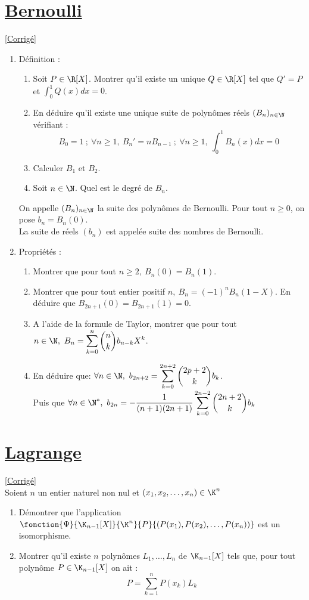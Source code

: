 \documentclass{book}
\begin{document}
	\section{\underline{Bernoulli} }
	\textcolor{blue}{\hyperref[sec:Bernoulli]{[Corrigé]}}\\
	\label{Bernoulli}
	\begin{enumerate}[leftmargin=*]
		\item Définition :
		\begin{enumerate}[label=\alph*.]
			\item Soit $P\in\R[X]$. Montrer qu'il existe un unique $Q\in\R[X]$ tel que $Q'=P$ et $\displaystyle\int_0^1 Q(x)dx=0$.
			\item En déduire qu'il existe une unique suite de polynômes réels $(B_n)_{n\in \N}$ vérifiant :
			$$B_0=1\ ; \ \forall n \geq 1, \ B_n'=nB_{n-1} \ ; \ \forall n \geq 1, \ \int_0^1 B_n(x)dx=0$$
			\item Calculer $B_1$ et $B_2$.
			\item Soit $n\in \N$. Quel est le degré de $B_n$.
		\end{enumerate}
		On appelle $(B_n)_{n\in \N}$ la suite des polynômes de Bernoulli. Pour tout $n\geq 0$, on pose $b_n=B_n(0)$. \\La suite de réels $(b_n)$ est appelée suite des nombres de Bernoulli.
		\item Propriétés :
		\begin{enumerate}[label=\alph*.]
			\item Montrer que pour tout $n\geq 2,\ B_n(0)=B_n(1)$.
			\item Montrer que pour tout entier positif $n,\ B_n=(-1)^nB_n(1-X)$. En déduire que $B_{2n+1}(0)=B_{2n+1}(1)=0$.
			\item A l'aide de la formule de Taylor, montrer que pour tout $n\in\N,\ B_n=\displaystyle\sum\limits_{k=0}^n \binom{n}{k}b_{n-k}X^k$.
			\item En déduire que: $\forall n\in\N,\ b_{2n+2}=\displaystyle\sum\limits_{k=0}^{2n+2}\binom{2p+2}{k}b_k$. \\Puis que $\forall n \in\N^*,\ b_{2n}=\displaystyle-\displaystyle\frac{1}{(n+1)(2n+1)}\displaystyle\sum\limits_{k=0}^{2n-2}\binom{2n+2}{k}b_k$    
		\end{enumerate}
	\end{enumerate}
	
	\section{\underline{Lagrange} }
	\textcolor{blue}{\hyperref[sec:Lagrange]{[Corrigé]}}\\
	\label{Lagrange}
	Soient $n$ un entier naturel non nul et $(x_1,x_2,\dots, x_n)\in \K^n$
	\begin{enumerate}[leftmargin=*]
		\item Démontrer que l'application $\fonction{\Psi}{\K_{n-1}[X]}{\K^n}{P}{(P(x_1),P(x_2),\dots,P(x_n))}$ est un isomorphisme.
		\item Montrer qu'il existe $n$ polynômes $L_1,\dots, L_n$ de $\K_{n-1}[X]$ tels que, pour tout polynôme $P\in\K_{n-1}[X]$ on ait :
		$$P=\sum\limits_{k=1}^n P(x_k)L_k$$
	\end{enumerate}
	
\end{document}
